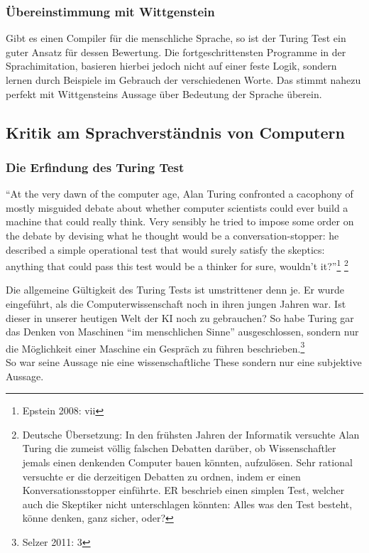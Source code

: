 \documentclass[10pt,a4paper]{article}
\begin{document}
\subsubsection{Übereinstimmung mit Wittgenstein}
Gibt es einen Compiler für die menschliche Sprache, so ist der Turing Test ein guter Ansatz für dessen Bewertung. Die fortgeschrittensten Programme in der Sprachimitation, basieren hierbei jedoch nicht auf einer feste Logik, sondern lernen durch Beispiele im Gebrauch der verschiedenen Worte. Das stimmt nahezu perfekt mit Wittgensteins Aussage über Bedeutung der Sprache überein.

\subsection{Kritik am Sprachverständnis von Computern}
\subsubsection{Die Erfindung des Turing Test}
\begin{displayquote}
\enquote{At the very dawn of the computer age, Alan Turing confronted a cacophony of
mostly misguided debate about whether computer scientists could ever build a
machine that could really think. Very sensibly he tried to impose some order on the
debate by devising what he thought would be a conversation-stopper: he described
a simple operational test that would surely satisfy the skeptics: anything that could
pass this test would be a thinker for sure, wouldn’t it?}\footnote{Epstein 2008: vii} \footnote{Deutsche Übersetzung: In den frühsten Jahren der Informatik versuchte Alan Turing die zumeist völlig falschen Debatten darüber, ob Wissenschaftler jemals einen denkenden Computer bauen könnten, aufzulösen. Sehr rational versuchte er die derzeitigen Debatten zu ordnen, indem er einen Konversationsstopper einführte. ER beschrieb einen simplen Test, welcher auch die Skeptiker nicht unterschlagen könnten: Alles was den Test besteht, könne denken, ganz sicher, oder?}
\end{displayquote}
Die allgemeine Gültigkeit des Turing Tests ist umstrittener denn  je. Er wurde eingeführt, als die Computerwissenschaft noch in ihren jungen Jahren war. Ist dieser in unserer heutigen Welt der KI noch zu gebrauchen? So habe Turing gar das Denken von Maschinen \enquote{im menschlichen Sinne} ausgeschlossen, sondern nur die Möglichkeit einer Maschine ein Gespräch zu führen beschrieben.\footnote{Selzer 2011: 3} \\
So war seine Aussage nie eine wissenschaftliche These sondern nur eine subjektive Aussage.
\end{document}
